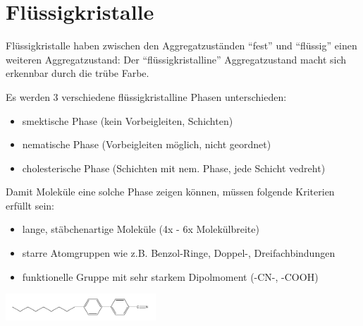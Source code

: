 \section{Flüssigkristalle}
Flüssigkristalle haben zwischen den Aggregatzuständen ``fest'' und ``flüssig'' einen weiteren Aggregatzustand: Der ``flüssigkristalline'' Aggregatzustand macht sich erkennbar durch die trübe Farbe.        

Es werden 3 verschiedene flüssigkristalline Phasen unterschieden:
\begin{itemize}
    \item smektische Phase (kein Vorbeigleiten, Schichten)
    \item nematische Phase (Vorbeigleiten möglich, nicht geordnet)
    \item cholesterische Phase (Schichten mit nem. Phase, jede Schicht vedreht)
\end{itemize}
Damit Moleküle eine solche Phase zeigen können, müssen folgende Kriterien erfüllt sein:
\begin{itemize}
    \item lange, stäbchenartige Moleküle (4x - 6x Molekülbreite)
    \item starre Atomgruppen wie z.B. Benzol-Ringe, Doppel-, Dreifachbindungen
    \item funktionelle Gruppe mit sehr starkem Dipolmoment (-CN-, -COOH)
\end{itemize}
\vspace{-0.2cm}
\begin{center}
    \includegraphics[height=1cm]{pictures/CN-Fluessigkrist.png}
\end{center}
\vspace{-0.5cm}

